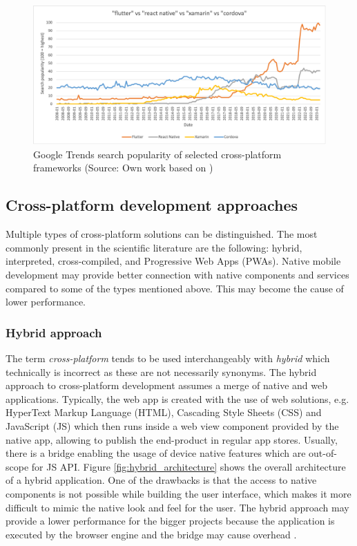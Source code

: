 \begin{figure}[h]
    \centering
    \includegraphics[width=\textwidth]{img/google_trends_comparison}
    \caption{Google Trends search popularity of selected cross-platform frameworks (Source: Own work based on \cite{trends_comparison})}
    \label{fig:trends_comparison}
\end{figure}

\subsection{Cross-platform development approaches}\label{chap:cross_platform_approaches}

Multiple types of cross-platform solutions can be distinguished. The most commonly present in the scientific literature are the following: hybrid, interpreted, cross-compiled, and Progressive Web Apps (PWAs). Native mobile development may provide better connection with native components and services compared to some of the types mentioned above. This may become the cause of lower performance.

\subsubsection*{Hybrid approach}

The term \emph{cross-platform} tends to be used interchangeably with \emph{hybrid} which technically is incorrect as these are not necessarily synonyms. The hybrid approach to cross-platform development assumes a merge of native and web applications. Typically, the web app is created with the use of web solutions, e.g. HyperText Markup Language (HTML), Cascading Style Sheets (CSS) and JavaScript (JS) which then runs inside a web view component provided by the native app, allowing to publish the end-product in regular app stores. Usually, there is a bridge enabling the usage of device native features which are out-of-scope for JS API. Figure \ref{fig:hybrid_architecture} shows the overall architecture of a hybrid application. One of the drawbacks is that the access to native components is not possible while building the user interface, which makes it more difficult to mimic the native look and feel for the user. The hybrid approach may provide a lower performance for the bigger projects because the application is executed by the browser engine and the bridge may cause overhead \cite{survey_taxonomy_cross_platform,comparison_technologies_multiplatform,cross_platform_development_study_rn_flutter,eval_rn_flutter,comp_analysis_hybrid_frameworks}.

